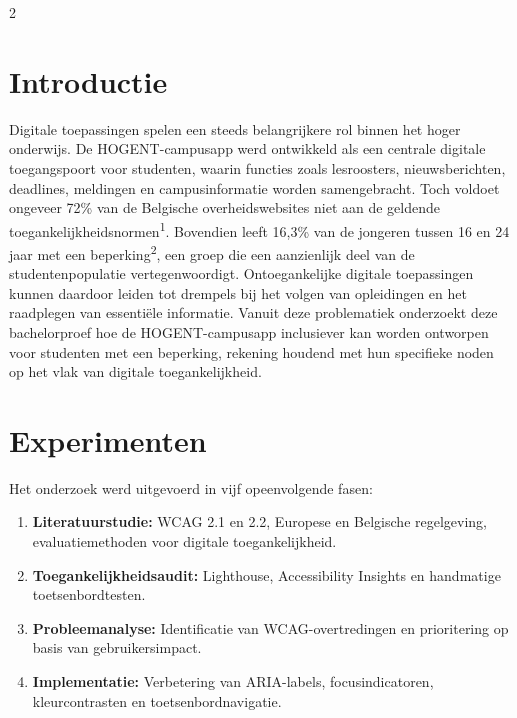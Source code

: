 \documentclass[a0,portrait]{hogent-poster}
\begin{document}
\begin{multicols}{2} %

\section{Introductie}

Digitale toepassingen spelen een steeds belangrijkere rol binnen het hoger onderwijs. De HOGENT-campusapp werd ontwikkeld als een centrale digitale toegangspoort voor studenten, waarin functies zoals lesroosters, nieuwsberichten, deadlines, meldingen en campusinformatie worden samengebracht. Toch voldoet ongeveer 72\% van de Belgische overheidswebsites niet aan de geldende toegankelijkheidsnormen\textsuperscript{1}. Bovendien leeft 16,3\% van de jongeren tussen 16 en 24 jaar met een beperking\textsuperscript{2}, een groep die een aanzienlijk deel van de studentenpopulatie vertegenwoordigt. Ontoegankelijke digitale toepassingen kunnen daardoor leiden tot drempels bij het volgen van opleidingen en het raadplegen van essentiële informatie. Vanuit deze problematiek onderzoekt deze bachelorproef hoe de HOGENT-campusapp inclusiever kan worden ontworpen voor studenten met een beperking, rekening houdend met hun specifieke noden op het vlak van digitale toegankelijkheid.

\section{Experimenten}

Het onderzoek werd uitgevoerd in vijf opeenvolgende fasen:

\begin{enumerate}
    \item \textbf{Literatuurstudie:} WCAG 2.1 en 2.2, Europese en Belgische regelgeving, evaluatiemethoden voor digitale toegankelijkheid.

    \item \textbf{Toegankelijkheidsaudit:} Lighthouse, Accessibility Insights en handmatige toetsenbordtesten.

    \item \textbf{Probleemanalyse:} Identificatie van WCAG-overtredingen en prioritering op basis van gebruikersimpact.

    \item \textbf{Implementatie:} Verbetering van ARIA-labels, focusindicatoren, kleurcontrasten en toetsenbordnavigatie.


\end{enumerate}
\end{multicols}
\end{document}
